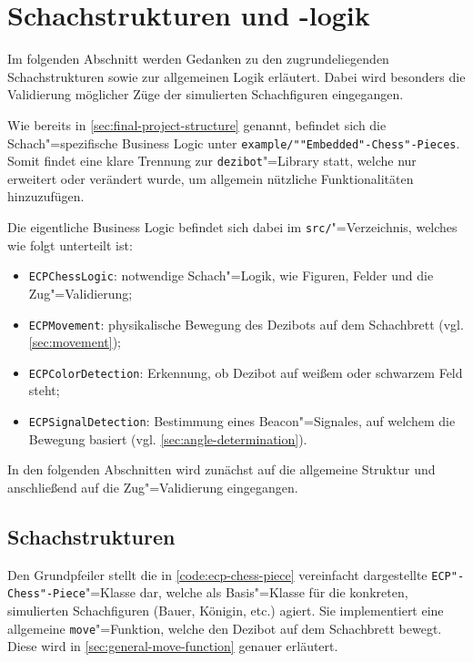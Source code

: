 
\section{Schachstrukturen und -logik}
\label{sec:chess-logic}

Im folgenden Abschnitt werden Gedanken zu den zugrundeliegenden Schachstrukturen sowie zur allgemeinen Logik erläutert. Dabei wird besonders die Validierung möglicher Züge der simulierten Schachfiguren eingegangen.

Wie bereits in \autoref{sec:final-project-structure} genannt, befindet sich die Schach"=spezifische Business Logic unter \texttt{example/""Embedded"-Chess"-Pieces}. Somit findet eine klare Trennung zur \texttt{dezibot}"=Library statt, welche nur erweitert oder verändert wurde, um allgemein nützliche Funktionalitäten hinzuzufügen.

Die eigentliche Business Logic befindet sich dabei im \texttt{src/}"=Verzeichnis, welches wie folgt unterteilt ist:

\begin{itemize}
    \item \texttt{ECPChessLogic}: notwendige Schach"=Logik, wie Figuren, Felder und die Zug"=Validierung;
    \item \texttt{ECPMovement}: physikalische Bewegung des Dezibots auf dem Schachbrett (vgl. \autoref{sec:movement});
    \item \texttt{ECPColorDetection}: Erkennung, ob Dezibot auf weißem oder schwarzem Feld steht;
    \item \texttt{ECPSignalDetection}: Bestimmung eines Beacon"=Signales, auf welchem die Bewegung basiert (vgl. \autoref{sec:angle-determination}).
\end{itemize}

In den folgenden Abschnitten wird zunächst auf die allgemeine Struktur und anschließend auf die Zug"=Validierung eingegangen.


\subsection{Schachstrukturen}


Den Grundpfeiler stellt die in \autoref{code:ecp-chess-piece} vereinfacht dargestellte \texttt{ECP"-Chess"-Piece}"=Klasse dar, welche als Basis"=Klasse für die konkreten, simulierten Schachfiguren (Bauer, Königin, etc.) agiert. Sie implementiert eine allgemeine \texttt{move}"=Funktion, welche den Dezibot auf dem Schachbrett bewegt. Diese wird in \autoref{sec:general-move-function} genauer erläutert.


